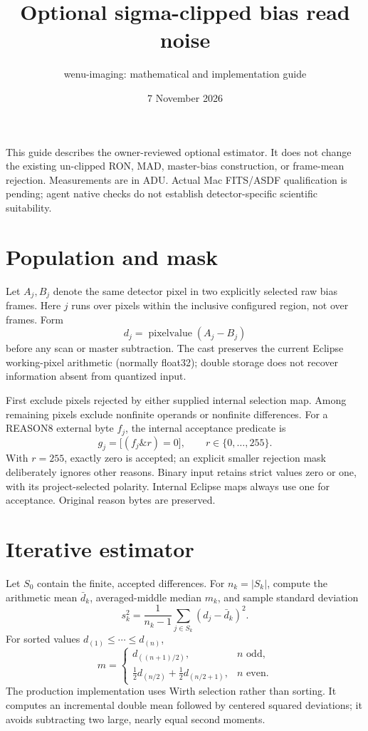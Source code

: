 \documentclass[11pt,a4paper]{article}
\title{Optional sigma-clipped bias read noise}
\author{wenu-imaging: mathematical and implementation guide}
\date{7 November 2026}
\begin{document}
\maketitle
\noindent This guide describes the owner-reviewed optional estimator. It does not change the existing un-clipped RON, MAD, master-bias construction, or frame-mean rejection. Measurements are in ADU. Actual Mac FITS/ASDF qualification is pending; agent native checks do not establish detector-specific scientific suitability.
\section{Population and mask}
Let $A_j,B_j$ denote the same detector pixel in two explicitly selected raw bias frames. Here $j$ runs over pixels within the inclusive configured region, not over frames. Form
\[
 d_j=\operatorname{pixelvalue}(A_j-B_j)
\]
before any scan or master subtraction. The cast preserves the current Eclipse working-pixel arithmetic (normally float32); double storage does not recover information absent from quantized input.

First exclude pixels rejected by either supplied internal selection map. Among remaining pixels exclude nonfinite operands or nonfinite differences. For a REASON8 external byte $f_j$, the internal acceptance predicate is
\[
 g_j = \bigl[(f_j\mathbin{\&}r)=0\bigr],\qquad r\in\{0,\ldots,255\}.
\]
With $r=255$, exactly zero is accepted; an explicit smaller rejection mask deliberately ignores other reasons. Binary input retains strict values zero or one, with its project-selected polarity. Internal Eclipse maps always use one for acceptance. Original reason bytes are preserved.
\section{Iterative estimator}
Let $S_0$ contain the finite, accepted differences. For $n_k=|S_k|$, compute the arithmetic mean $\bar d_k$, averaged-middle median $m_k$, and sample standard deviation
\[
 s_k^2=\frac{1}{n_k-1}\sum_{j\in S_k}(d_j-\bar d_k)^2.
\]
For sorted values $d_{(1)}\leq\cdots\leq d_{(n)}$,
\[
 m=\begin{cases}d_{((n+1)/2)},&n\text{ odd},\\
 \tfrac12d_{(n/2)}+\tfrac12d_{(n/2+1)},&n\text{ even}.\end{cases}
\]
The production implementation uses Wirth selection rather than sorting. It computes an incremental double mean followed by centered squared deviations; it avoids subtracting two large, nearly equal second moments.
\end{document}
